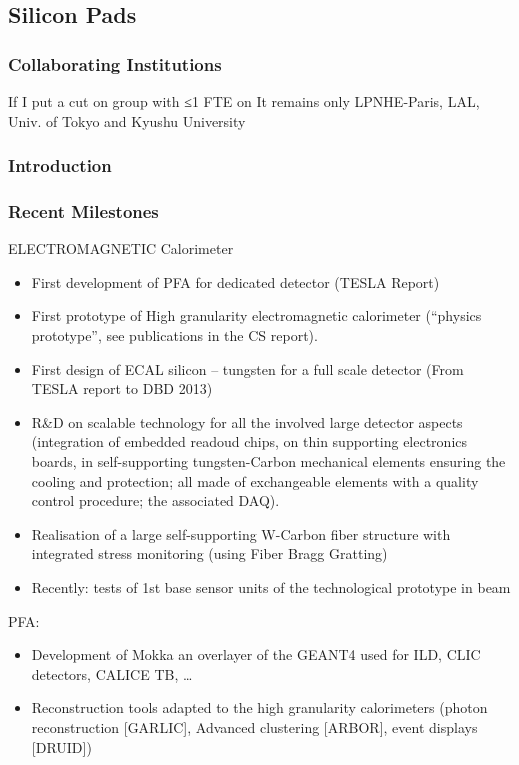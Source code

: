 \subsection{Silicon Pads}
\subsubsection{Collaborating Institutions}
If I put a cut on group with ≤1 FTE on 
It remains only LPNHE-Paris, LAL, Univ. of Tokyo and Kyushu University
\subsubsection{Introduction}
\subsubsection{Recent Milestones}
ELECTROMAGNETIC Calorimeter
\begin{itemize}
	\item First development of PFA for dedicated detector (TESLA Report)
	\item First prototype of High granularity electromagnetic calorimeter (“physics prototype”, see publications in the CS report).
	\item First design of ECAL silicon – tungsten for a full scale detector (From TESLA report to DBD 2013)
	\item R\&D on scalable technology for all the involved large detector aspects (integration of embedded readoud chips, on thin supporting electronics boards, in self-supporting tungsten-Carbon mechanical elements ensuring the cooling and protection; all made of exchangeable elements with a quality control procedure; the associated DAQ).
	\item Realisation of a large self-supporting W-Carbon fiber structure with integrated stress monitoring (using Fiber Bragg Gratting) 
	\item Recently: tests of 1st base sensor units of the technological prototype in beam
\end{itemize}
PFA:
\begin{itemize}
	\item Development of Mokka an overlayer of the GEANT4 used for ILD, CLIC detectors, CALICE TB, …
	\item Reconstruction tools adapted to the high granularity calorimeters (photon reconstruction [GARLIC], Advanced clustering [ARBOR], event displays [DRUID])
\end{itemize}

